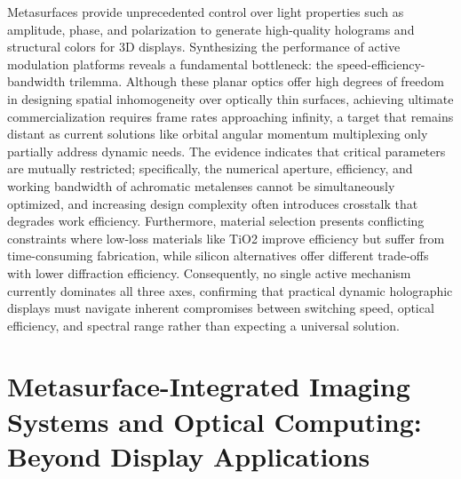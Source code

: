 \documentclass[11pt]{article}
\begin{document}
Metasurfaces provide unprecedented control over light properties such as amplitude, phase, and polarization to generate high-quality holograms and structural colors for 3D displays. Synthesizing the performance of active modulation platforms reveals a fundamental bottleneck: the speed-efficiency-bandwidth trilemma. Although these planar optics offer high degrees of freedom in designing spatial inhomogeneity over optically thin surfaces, achieving ultimate commercialization requires frame rates approaching infinity, a target that remains distant as current solutions like orbital angular momentum multiplexing only partially address dynamic needs. The evidence indicates that critical parameters are mutually restricted; specifically, the numerical aperture, efficiency, and working bandwidth of achromatic metalenses cannot be simultaneously optimized, and increasing design complexity often introduces crosstalk that degrades work efficiency. Furthermore, material selection presents conflicting constraints where low-loss materials like TiO2 improve efficiency but suffer from time-consuming fabrication, while silicon alternatives offer different trade-offs with lower diffraction efficiency. Consequently, no single active mechanism currently dominates all three axes, confirming that practical dynamic holographic displays must navigate inherent compromises between switching speed, optical efficiency, and spectral range rather than expecting a universal solution. \citep{doi_10_1515_nanoph_2025_0269_b999ce93} \citep{doi_10_1002_inf2_12116_b5c46838}

\section{Metasurface-Integrated Imaging Systems and Optical Computing: Beyond Display Applications}\label{metasurface-integrated-imaging-systems-and-optical-computing-beyond-display-applications}
\end{document}
